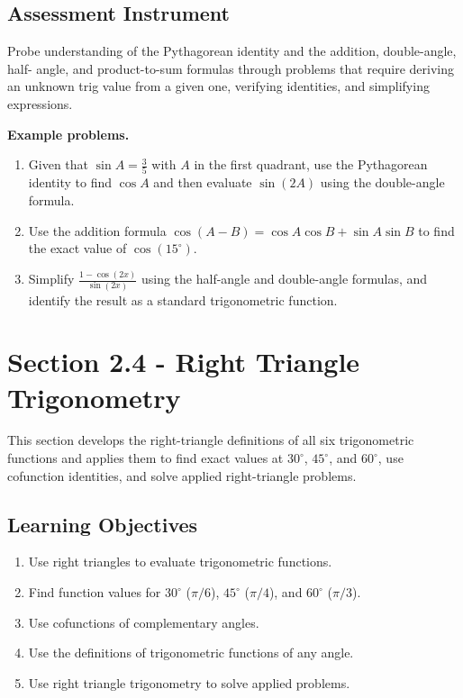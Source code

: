 \subsection{Assessment Instrument}
\label{ssec:asse-3669}

Probe understanding of the Pythagorean identity and the addition, double-angle, half-
angle, and product-to-sum formulas through problems that require deriving an unknown trig
value from a given one, verifying identities, and simplifying expressions.

\textbf{Example problems.}
\begin{enumerate}
    \item Given that $\sin A = \frac{3}{5}$ with $A$ in the first quadrant, use the Pythagorean identity to find $\cos A$ and then evaluate $\sin(2A)$ using the double-angle formula.
    \item Use the addition formula $\cos(A - B) = \cos A \cos B + \sin A \sin B$ to find the exact value of $\cos(15^{\circ})$.
    \item Simplify $\frac{1 - \cos(2x)}{\sin(2x)}$ using the half-angle and double-angle formulas, and identify the result as a standard trigonometric function.
\end{enumerate}

\section{Section 2.4 - Right Triangle Trigonometry}
\label{sec:sect-974a}

This section develops the right-triangle definitions of all six trigonometric functions
and applies them to find exact values at $30^{\circ}$, $45^{\circ}$, and $60^{\circ}$, use
cofunction identities, and solve applied right-triangle problems.

\subsection{Learning Objectives}
\label{ssec:lear-fe6e}

\begin{enumerate}
    \item Use right triangles to evaluate trigonometric functions.
    \item Find function values for $30^{\circ}$ ($\pi/6$), $45^{\circ}$ ($\pi/4$), and $60^{\circ}$ ($\pi/3$).
    \item Use cofunctions of complementary angles.
    \item Use the definitions of trigonometric functions of any angle.
    \item Use right triangle trigonometry to solve applied problems.
\end{enumerate}

